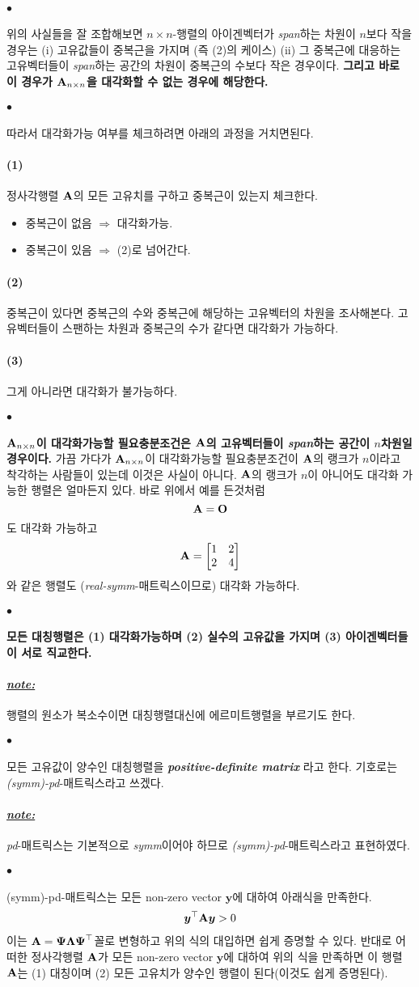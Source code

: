 \documentclass[12pt,oneside,english,a4paper]{article}
\def\ck{\paragraph{\Large$\bullet$}\Large}
\def\note{\paragraph{\Large\textit{\underline{note:}}}\Large}
\def\one{\paragraph{\Large(1)}\Large}
\def\two{\paragraph{\Large(2)}\Large}
\def\three{\paragraph{\Large(3)}\Large}
\newcommand{\bfA}{\mbox{$\bf{A}$}}
\begin{document}
\ck 위의 사실들을 잘 조합해보면 $n \times n$-행렬의 아이겐벡터가 \emph{span}하는 차원이 $n$보다 작을 경우는 (i) 고유값들이 중복근을 가지며 (즉 (2)의 케이스) (ii) 그 중복근에 대응하는 고유벡터들이 \emph{span}하는 공간의 차원이 중복근의 수보다 작은 경우이다. \textbf{그리고 바로 이 경우가 ${\bf A}_ {n \times n}$을 대각화할 수 없는 경우에 해당한다.}

\ck 따라서 대각화가능 여부를 체크하려면 아래의 과정을 거치면된다. 
\one 정사각행렬 $\bfA$의 모든 고유치를 구하고 중복근이 있는지 체크한다. 
\begin{itemize}
\item 중복근이 없음 $\Longrightarrow$ 대각화가능. 
\item 중복근이 있음 $\Longrightarrow$ (2)로 넘어간다. 
\end{itemize}
\two 중복근이 있다면 중복근의 수와 중복근에 해당하는 고유벡터의 차원을 조사해본다. 고유벡터들이 스팬하는 차원과 중복근의 수가 같다면 대각화가 가능하다. 
\three 그게 아니라면 대각화가 불가능하다. 

  
\ck \textbf{${\bf A}_ {n\times n}$이 대각화가능할 필요충분조건은 $\bf A$의 고유벡터들이 \emph{span}하는 공간이 $n$차원일 경우이다.} 가끔 가다가 ${\bf A}_ {n\times n}$이 대각화가능할 필요충분조건이 $\bf A$의 랭크가 $n$이라고 착각하는 사람들이 있는데 이것은 사실이 아니다. $\bf A$의 랭크가 $n$이 아니어도 대각화 가능한 행렬은 얼마든지 있다. 바로 위에서 예를 든것처럼 
\[
\bfA=\bf O
\]
도 대각화 가능하고 
\[
\bfA=\begin{bmatrix} 1 & 2 \\ 2 & 4\end{bmatrix}
\]
와 같은 행렬도 (\emph{real-symm}-매트릭스이므로) 대각화 가능하다. 

\ck \textbf{모든 대칭행렬은 (1) 대각화가능하며 (2) 실수의 고유값을 가지며 (3) 아이겐벡터들이 서로 직교한다.} 

\note 행렬의 원소가 복소수이면 대칭행렬대신에 에르미트행렬을 부르기도 한다. 

\ck 모든 고유값이 양수인 대칭행렬을 \textbf{\emph{positive-definite matrix}} 라고 한다. 기호로는 \emph{(symm)-pd}-매트릭스라고 쓰겠다. 

\note \emph{pd}-매트릭스는 기본적으로 \emph{symm}이어야 하므로 \emph{(symm)-pd}-매트릭스라고 표현하였다. 

\ck (symm)-pd-매트릭스는 모든 non-zero vector ${\boldsymbol y}$에 대하여 아래식을 만족한다. 
\begin{align*}
{\boldsymbol y}^\top{\bf A}{\boldsymbol y}>0
\end{align*}
이는 ${\bf A}={\boldsymbol \Psi}{\boldsymbol \Lambda}{\boldsymbol \Psi}^\top$꼴로 변형하고 위의 식의 대입하면 쉽게 증명할 수 있다. 반대로 어떠한 정사각행렬 ${\bf A}$가 모든 non-zero vector ${\boldsymbol y}$에 대하여 위의 식을 만족하면 이 행렬 ${\bf A}$는 (1) 대칭이며 (2) 모든 고유치가 양수인 행렬이 된다(이것도 쉽게 증명된다). 
\end{document}
